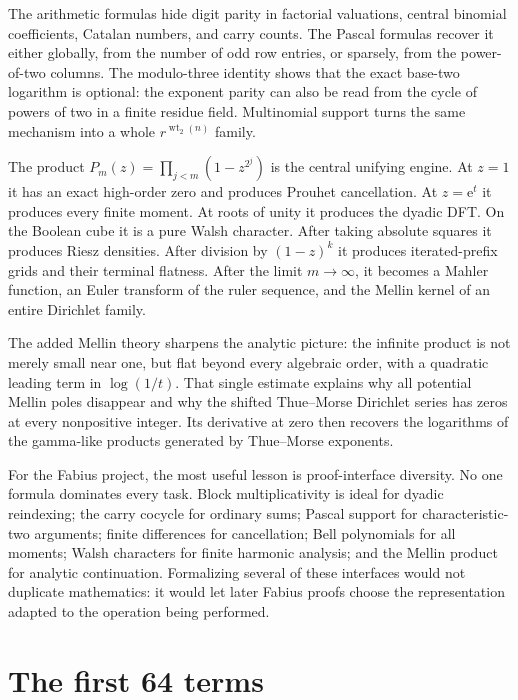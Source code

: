 \documentclass[11pt,oneside]{article}
\numberwithin{equation}{section}
\theoremstyle{definition}
\theoremstyle{remark}
\newcommand{\e}{\mathrm e}
\newcommand{\wt}{\operatorname{wt}_2}
\begin{document}
The arithmetic formulas hide digit parity in factorial valuations, central
binomial coefficients, Catalan numbers, and carry counts.  The Pascal formulas
recover it either globally, from the number of odd row entries, or sparsely,
from the power-of-two columns.  The modulo-three identity shows that the exact
base-two logarithm is optional: the exponent parity can also be read from the
cycle of powers of two in a finite residue field.  Multinomial support turns the
same mechanism into a whole \(r^{\wt(n)}\) family.

The product
\(P_m(z)=\prod_{j<m}(1-z^{2^j})\) is the central unifying engine.  At
\(z=1\) it has an exact high-order zero and produces Prouhet cancellation.  At
\(z=\e^t\) it produces every finite moment.  At roots of unity it produces the
dyadic DFT.  On the Boolean cube it is a pure Walsh character.  After taking
absolute squares it produces Riesz densities.  After division by
\((1-z)^k\) it produces iterated-prefix grids and their terminal flatness.
After the limit \(m\to\infty\), it becomes a Mahler function, an Euler
transform of the ruler sequence, and the Mellin kernel of an entire Dirichlet
family.

The added Mellin theory sharpens the analytic picture: the infinite product is
not merely small near one, but flat beyond every algebraic order, with a
quadratic leading term in \(\log(1/t)\).  That single estimate explains why
all potential Mellin poles disappear and why the shifted Thue--Morse Dirichlet
series has zeros at every nonpositive integer.  Its derivative at zero then
recovers the logarithms of the gamma-like products generated by Thue--Morse
exponents.

For the Fabius project, the most useful lesson is proof-interface diversity.
No one formula dominates every task.  Block multiplicativity is ideal for
dyadic reindexing; the carry cocycle for ordinary sums; Pascal support for
characteristic-two arguments; finite differences for cancellation; Bell
polynomials for all moments; Walsh characters for finite harmonic analysis;
and the Mellin product for analytic continuation.  Formalizing several of
these interfaces would not duplicate mathematics: it would let later Fabius
proofs choose the representation adapted to the operation being performed.

\appendix

\section[First 64 terms]{The first 64 terms}
\label{app:first-terms}
\end{document}

